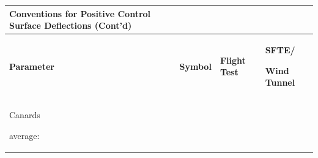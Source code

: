 \documentclass[
]{book}
\begin{document}
\begin{longtable}[]{@{}llll@{}}
\toprule
\begin{minipage}[b]{0.35\columnwidth}\raggedright
\textbf{Conventions for Positive Control Surface Deflections (Cont'd)}\strut
\end{minipage} & \begin{minipage}[b]{0.13\columnwidth}\raggedright
\strut
\end{minipage} & \begin{minipage}[b]{0.26\columnwidth}\raggedright
\strut
\end{minipage} & \begin{minipage}[b]{0.14\columnwidth}\raggedright
\strut
\end{minipage}\tabularnewline
\midrule
\endhead
\begin{minipage}[t]{0.35\columnwidth}\raggedright
\textbf{Parameter}\strut
\end{minipage} & \begin{minipage}[t]{0.13\columnwidth}\raggedright
\textbf{Symbol}\strut
\end{minipage} & \begin{minipage}[t]{0.26\columnwidth}\raggedright
\textbf{Flight Test}\strut
\end{minipage} & \begin{minipage}[t]{0.14\columnwidth}\raggedright
\textbf{SFTE/}

\textbf{Wind Tunnel}\strut
\end{minipage}\tabularnewline
\begin{minipage}[t]{0.35\columnwidth}\raggedright
Canards

average:


\end{minipage}
\end{longtable}
\end{document}
